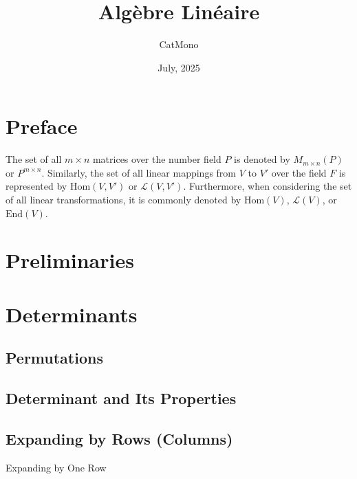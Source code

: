 \documentclass[11pt]{../../TexTemplate/elegantbook} %
\title{Algèbre Linéaire} %
\author{CatMono} %
\date{July, 2025} %
\begin{document}
\maketitle %

\frontmatter        %
\tableofcontents    %

\chapter{Preface}   %
The set of all $m \times n$ matrices over the number field $P$ is denoted by \(M_{m \times n}(P)\) or \(P^{m \times n}\). 
Similarly, the set of all linear mappings from $V$ to $V'$ over the field $F$ 
is represented by \(\mathrm{Hom}(V,V')\) or \(\mathcal{L}(V,V')\). 
Furthermore, when considering the set of all linear transformations, 
it is commonly denoted by \(\mathrm{Hom}(V)\), \(\mathcal{L}(V)\), or \(\mathrm{End}(V)\).


\mainmatter         %

\chapter{Preliminaries} 

\chapter{Determinants} %
\section{Permutations} %

\section{Determinant and Its Properties} %

\section{Expanding by Rows (Columns)} %
\begin{leftbarTitle}{Expanding by One Row}\end{leftbarTitle}
\end{document}

